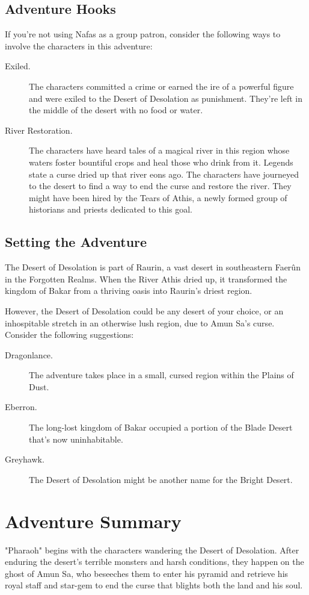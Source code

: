 \documentclass[10pt,a4paper,twoside,bg=print,twocolumn,openany,nodeprecatedcode]{dndbook}
\begin{document}
\subsection{Adventure Hooks}
If you're not using Nafas as a group patron, consider the following ways to involve the characters in this adventure:


\begin{description}
\item[Exiled.]
The characters committed a crime or earned the ire of a powerful figure and were exiled to the Desert of Desolation as punishment. They're left in the middle of the desert with no food or water.
\item[River Restoration.]
The characters have heard tales of a magical river in this region whose waters foster bountiful crops and heal those who drink from it. Legends state a curse dried up that river eons ago. The characters have journeyed to the desert to find a way to end the curse and restore the river. They might have been hired by the Tears of Athis, a newly formed group of historians and priests dedicated to this goal.
\end{description}

\subsection{Setting the Adventure}
The Desert of Desolation is part of Raurin, a vast desert in southeastern Faerûn in the Forgotten Realms. When the River Athis dried up, it transformed the kingdom of Bakar from a thriving oasis into Raurin's driest region.

However, the Desert of Desolation could be any desert of your choice, or an inhospitable stretch in an otherwise lush region, due to Amun Sa's curse. Consider the following suggestions:


\begin{description}
\item[Dragonlance.]
The adventure takes place in a small, cursed region within the Plains of Dust.
\item[Eberron.]
The long-lost kingdom of Bakar occupied a portion of the Blade Desert that's now uninhabitable.
\item[Greyhawk.]
The Desert of Desolation might be another name for the Bright Desert.
\end{description}

\section{Adventure Summary}
"Pharaoh" begins with the characters wandering the Desert of Desolation. After enduring the desert's terrible monsters and harsh conditions, they happen on the ghost of Amun Sa, who beseeches them to enter his pyramid and retrieve his royal staff and star-gem to end the curse that blights both the land and his soul.
\end{document}
